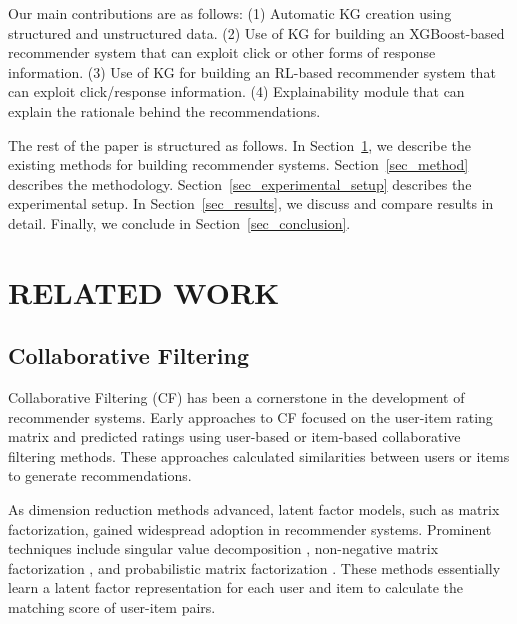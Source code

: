\documentclass[11pt]{article}
\begin{document}
Our main contributions are as follows:
(1) Automatic KG creation using structured and unstructured data. (2) Use of KG for building an XGBoost-based recommender system that can exploit click or other forms of response information. (3) Use of KG for building an RL-based recommender system that can exploit click/response information. (4) Explainability module that can explain the rationale behind the recommendations.

The rest of the paper is structured as follows. In Section~\ref{rel_work}, we describe the existing methods for building recommender systems. Section~\ref{sec_method} describes the methodology. Section~\ref{sec_experimental_setup} describes the experimental setup. In Section~\ref{sec_results}, we discuss and compare results in detail. Finally, we conclude in Section~\ref{sec_conclusion}.


\section{RELATED WORK} \label{rel_work}
\subsection{Collaborative Filtering}
Collaborative Filtering (CF) has been a cornerstone in the development of recommender systems. Early approaches to CF focused on the user-item rating matrix and predicted ratings using user-based \cite{konstan1997grouplens, resnick1994grouplens, herlocker1999algorithmic} or item-based \cite{linden2003amazon, sarwar2001item} collaborative filtering methods. These approaches calculated similarities between users or items to generate recommendations.

As dimension reduction methods advanced, latent factor models, such as matrix factorization, gained widespread adoption in recommender systems. Prominent techniques include singular value decomposition \cite{koren2009matrix}, non-negative matrix factorization \cite{lee2000algorithms}, and probabilistic matrix factorization \cite{mnih2007probabilistic}. These methods essentially learn a latent factor representation for each user and item to calculate the matching score of user-item pairs.
\end{document}
